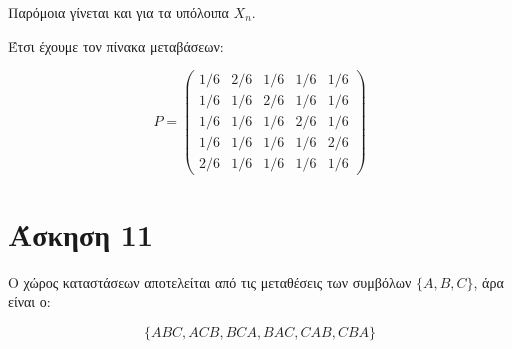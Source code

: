 \documentclass[11pt,a4paper]{article}
\begin{document}
Παρόμοια γίνεται και για τα υπόλοιπα $X_n$.

Έτσι έχουμε τον πίνακα μεταβάσεων:


\begin{equation*}
    P =
    \begin{pmatrix}
        1/6 & 2/6 & 1/6 & 1/6 & 1/6 \\
        1/6 & 1/6 & 2/6 & 1/6 & 1/6 \\
        1/6 & 1/6 & 1/6 & 2/6 & 1/6 \\
        1/6 & 1/6 & 1/6 & 1/6 & 2/6 \\
        2/6 & 1/6 & 1/6 & 1/6 & 1/6
    \end{pmatrix}
\end{equation*}

\section*{Άσκηση 11}

Ο χώρος καταστάσεων αποτελείται από τις μεταθέσεις των συμβόλων $\{A, B, C\}$, άρα είναι ο:

$$
    \{ABC, ACB, BCA, BAC, CAB, CBA\}
$$
\end{document}
